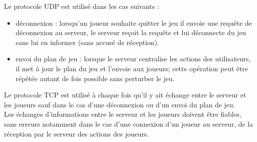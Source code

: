 \par
Le protocole UDP est utilisé dans les cas suivants :
\begin{itemize}
	\item déconnexion : lorsqu'un joueur souhaite quitter le jeu il envoie une requête de déconnexion au serveur, le serveur reçoit la requête et lui déconnecte du jeu sans lui en informer (sans accusé de réception).
	
	\item envoi du plan de jeu : lorsque le serveur centralise les actions des utilisateurs, il met à jour le plan du jeu et l'envoie aux joueurs; cette opération peut être répétée autant de fois possible sans perturber le jeu.\\
\end{itemize}

\par
Le protocole TCP est utilisé à chaque fois qu'il y ait échange entre le serveur et les joueurs sauf dans le cas d'une déconnexion ou d'un envoi du plan de jeu.\\

Les échanges d'informations entre le serveur et les joueurs doivent être fiables, sans erreurs notamment dans le cas d'une connexion d'un joueur au serveur, de la réception par le serveur des actions des joueurs.